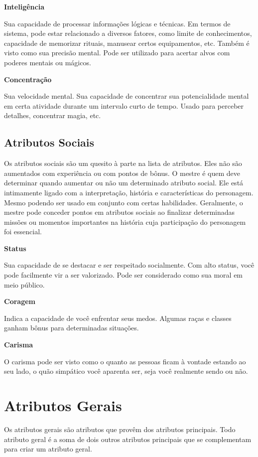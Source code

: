 \textbf{Inteligência}

Sua capacidade de processar informações lógicas e técnicas. Em termos de sistema, pode estar relacionado a diversos fatores, como limite de conhecimentos, capacidade de memorizar rituais, manusear certos equipamentos, etc. Também é visto como sua precisão mental. Pode ser utilizado para acertar alvos com poderes mentais ou mágicos.

\textbf{Concentração}

Sua velocidade mental. Sua capacidade de concentrar sua potencialidade mental em certa atividade durante um intervalo curto de tempo. Usado para perceber detalhes, concentrar magia, etc.

\subsection{Atributos Sociais}

Os atributos sociais são um quesito à parte na lista de atributos. Eles não são aumentados com experiência ou com pontos de bônus. O mestre é quem deve determinar quando aumentar ou não um determinado atributo social. Ele está intimamente ligado com a interpretação, história e características do personagem. Mesmo podendo ser usado em conjunto com certas habilidades. Geralmente, o mestre pode conceder pontos em atributos sociais ao finalizar determinadas missões ou momentos importantes na história cuja participação do personagem foi essencial.

\textbf{Status}

Sua capacidade de se destacar e ser respeitado socialmente. Com alto status, você pode facilmente vir a ser valorizado. Pode ser considerado como sua moral em meio público.

\textbf{Coragem}

Indica a capacidade de você enfrentar seus medos. Algumas raças e classes ganham bônus para determinadas situações.

\textbf{Carisma}

O carisma pode ser visto como o quanto as pessoas ficam à vontade estando ao seu lado, o quão simpático você aparenta ser, seja você realmente sendo ou não.

\section{Atributos Gerais}

Os atributos gerais são atributos que provêm dos atributos principais. Todo atributo geral é a soma de dois outros atributos principais que se complementam para criar um atributo geral.

